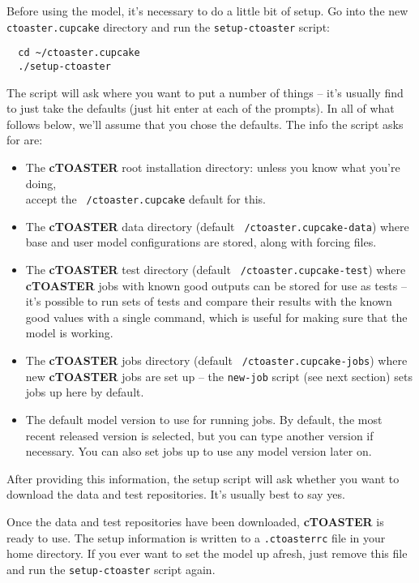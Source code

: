 \documentclass[a4paper,10pt,article]{memoir}
\begin{document}
Before using the model, it's necessary to do a little bit of setup.
Go into the new \texttt{ctoaster.cupcake} directory and run the
\texttt{setup-ctoaster} script:
\begin{verbatim}
  cd ~/ctoaster.cupcake
  ./setup-ctoaster
\end{verbatim}
The script will ask where you want to put a number of things -- it's usually find to just take the defaults (just hit enter at each of the prompts).  In all of what follows below, we'll assume that you chose the defaults. The
info the script asks for are:
\begin{itemize}
  \item{The \textbf{cTOASTER} root installation directory: unless you know what
    you're doing, 
    \\accept the \texttt{~/ctoaster.cupcake} default for this.}
  \item{The \textbf{cTOASTER} data directory (default \texttt{~/ctoaster.cupcake-data})
    where base and user model configurations are stored, along with
    forcing files.}
  \item{The \textbf{cTOASTER} test directory (default \texttt{~/ctoaster.cupcake-test})
    where \textbf{cTOASTER} jobs with known good outputs can be stored for use as
    tests -- it's possible to run sets of tests and compare their
    results with the known good values with a single command, which is
    useful for making sure that the model is working.}
  \item{The \textbf{cTOASTER} jobs directory (default \texttt{~/ctoaster.cupcake-jobs})
    where new \textbf{cTOASTER} jobs are set up -- the \texttt{new-job} script
    (see next section) sets jobs up here by default.}
  \item{The default model version to use for running jobs. 
    By default, the most recent released version is selected, 
    but you can  type another version if necessary. 
    You can also set jobs up to  use any model version later on.}
\end{itemize}
After providing this information, the setup script will ask whether you want to download the data and test repositories. It's usually best to say yes.

Once the data and test repositories have been downloaded, \textbf{cTOASTER} is ready to use.  The setup information is written to a \texttt{.ctoasterrc} file in your home directory. If you ever want to set the model up afresh, just remove this file and run the \texttt{setup-ctoaster} script again.
\end{document}
